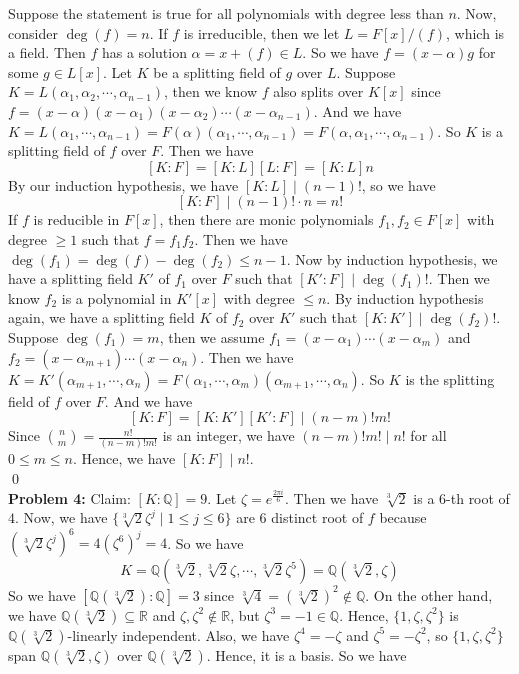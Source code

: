 \documentclass[12pt]{amsart}
\newcommand{\R}{\mathbb{R}}
\newcommand{\Q}{\mathbb{Q}}
\begin{document}
Suppose the statement is true for all polynomials with degree less than $n$. Now, consider $\deg(f)=n$. If $f$ is irreducible, then we let $L=F[x]/(f)$, which is a field. Then $f$ has a solution $\alpha=x+(f)\in L$. So we have $f=(x-\alpha)g$ for some $g\in L[x]$. Let $K$ be a splitting field of $g$ over $L$. Suppose $K=L(\alpha_1,\alpha_2,\cdots, \alpha_{n-1})$, then we know $f$ also splits over $K[x]$ since $f=(x-\alpha)(x-\alpha_1)(x-\alpha_2)\cdots(x-\alpha_{n-1})$. And we have $K=L(\alpha_1,\cdots,\alpha_{n-1})=F(\alpha)(\alpha_1,\cdots,\alpha_{n-1})=F(\alpha,\alpha_1,\cdots,\alpha_{n-1})$. So $K$ is a splitting field of $f$ over $F$. Then we have 
\[[K:F]=[K:L][L:F]=[K:L]n\]
By our induction hypothesis, we have $[K:L]\mid (n-1)!$, so we have 
\[[K:F]\mid (n-1)!\cdot n=n!\]
If $f$ is reducible in $F[x]$, then there are monic polynomials $f_1,f_2\in F[x]$ with degree $\geq 1$ such that $f=f_1f_2$. Then we have $\deg(f_1)=\deg(f)-\deg(f_2)\leq n-1$. Now by induction hypothesis, we have a splitting field $K'$ of $f_1$ over $F$ such that $[K':F]\mid \deg(f_1)!$. Then we know $f_2$ is a polynomial in $K'[x]$ with degree $\leq n$. By induction hypothesis again, we have a splitting field $K$ of $f_2$ over $K'$ such that $[K:K']\mid \deg(f_2)!$. Suppose $\deg(f_1)=m$, then we assume $f_1=(x-\alpha_1)\cdots (x-\alpha_m)$ and $f_2=(x-\alpha_{m+1})\cdots (x-\alpha_{n})$. Then we have $K=K'(\alpha_{m+1},\cdots,\alpha_n)=F(\alpha_1,\cdots,\alpha_m)(\alpha_{m+1},\cdots ,\alpha_n)$. So $K$ is the splitting field of $f$ over $F$. And we have 
\[[K:F]=[K:K'][K':F]\mid (n-m)!m!\]
Since ${n\choose m}=\frac{n!}{(n-m)!m!}$ is an integer, we have $(n-m)!m!\mid n!$ for all $0\leq m\leq n$. Hence, we have $[K:F]\mid n!$.\\
\qed\\
\textbf{Problem 4:} Claim: $[K:\Q]=9$. Let $\zeta=e^{\frac{2\pi i}{6}}$. Then we have $\sqrt[3]{2}$ is a $6$-th root of $4$. Now, we have $\{\sqrt[3]{2}\zeta^j\mid 1\leq j\leq 6\}$ are 6 distinct root of $f$ because $(\sqrt[3]{2}\zeta^j)^6=4(\zeta^6)^j=4$. So we have 
\[K=\Q(\sqrt[3]{2},\sqrt[3]{2}\zeta,\cdots,\sqrt[3]{2}\zeta^5)=\Q(\sqrt[3]{2},\zeta)\]
So we have $[\Q(\sqrt[3]{2}):\Q]=3$ since $\sqrt[3]{4}=(\sqrt[3]{2})^2\notin \Q$. On the other hand, we have $\Q(\sqrt[3]{2})\subseteq \R$ and $\zeta,\zeta^2\notin \R$, but $\zeta^3=-1\in \Q$. Hence, $\{1,\zeta,\zeta^2\}$ is $\Q(\sqrt[3]{2})$-linearly independent. Also, we have $\zeta^4=-\zeta$ and $\zeta^5=-\zeta^2$, so $\{1,\zeta,\zeta^2\}$ span $\Q(\sqrt[3   ]{2},\zeta)$ over $\Q(\sqrt[3]{2})$. Hence, it is a basis. So we have 
\end{document}
